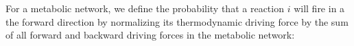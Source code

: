For a metabolic network, we define the probability that a reaction $i$ will fire in a the forward direction by normalizing its thermodynamic driving force by the sum of all forward and backward driving forces in the metabolic network: